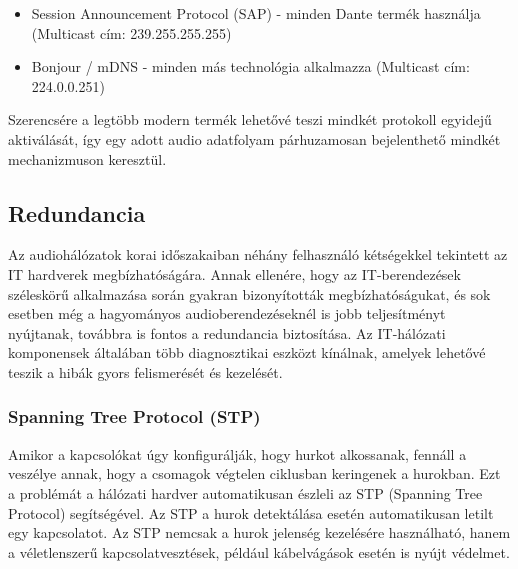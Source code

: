 \begin{itemize}
	\item Session Announcement Protocol (SAP) - minden Dante termék használja (Multicast cím: 239.255.255.255)
\end{itemize}

\begin{itemize}
	\item Bonjour / mDNS - minden más technológia alkalmazza (Multicast cím: 224.0.0.251) 
\end{itemize}
Szerencsére a legtöbb modern termék lehetővé teszi mindkét protokoll egyidejű
aktiválását, így egy adott audio adatfolyam párhuzamosan bejelenthető mindkét
mechanizmuson keresztül.

\subsection{Redundancia}

Az audiohálózatok korai időszakaiban néhány felhasználó kétségekkel
tekintett az IT hardverek megbízhatóságára. Annak ellenére, hogy az IT-berendezések
széleskörű alkalmazása során gyakran bizonyították megbízhatóságukat, és
sok esetben még a hagyományos audioberendezéseknél is jobb teljesítményt nyújtanak,
továbbra is fontos a redundancia biztosítása. Az IT-hálózati komponensek általában
több diagnosztikai eszközt kínálnak, amelyek lehetővé teszik a hibák gyors
felismerését és kezelését.


\subsubsection{Spanning Tree Protocol (STP)}

Amikor a kapcsolókat úgy konfigurálják, hogy hurkot alkossanak, fennáll a
veszélye annak, hogy a csomagok végtelen ciklusban keringenek a hurokban. 
Ezt a problémát a hálózati hardver automatikusan észleli az STP (Spanning Tree Protocol)
segítségével. Az STP a hurok detektálása esetén automatikusan letilt egy kapcsolatot. 
Az STP nemcsak a hurok jelenség kezelésére használható, hanem a véletlenszerű 
kapcsolatvesztések, például kábelvágások esetén is nyújt védelmet.

